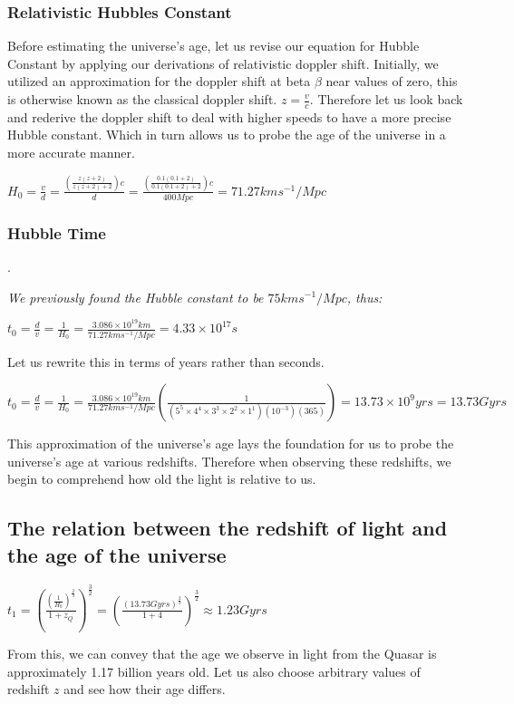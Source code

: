 \documentclass{article}
\begin{document}
{\subsubsection{Relativistic Hubbles Constant}
Before estimating the universe's age, let us revise our equation for Hubble Constant by applying our derivations of relativistic doppler shift. Initially, we utilized an approximation for the doppler shift at beta $\beta$ near values of zero, this is otherwise known as the classical doppler shift. $ z =\frac{v}{c}$. Therefore let us look back and rederive the doppler shift to deal with higher speeds to have a more precise Hubble constant. Which in turn allows us to probe the age of the universe in a more accurate manner.
\begin{center}
	$\boxed{
H_0 = \frac{v}{d} = \frac{ \left(\frac{z(z+2)}{z(z+2)+2}\right)c }{d} = \frac{ \left(\frac{0.1(0.1+2)}{0.1(0.1+2)+2}\right)c }{400Mpc} = 71.27 kms^{-1}/Mpc}
$
\end{center}
\subsubsection{Hubble Time}
.

\textit{We previously found the Hubble constant to be $75kms^{-1}/Mpc$, thus:}
\begin{center}
	$\boxed{
	t_0 = \frac{d}{v}=\frac{1}{H_0} = \frac{3.086\times10^{19}km}{71.27kms^{-1}/Mpc} = 4.33\times10^{17}s}
	$
\end{center}
Let us rewrite this in terms of years rather than seconds.
\begin{center}
	$\boxed{
		t_0 = \frac{d}{v}=\frac{1}{H_0}= \frac{3.086\times10^{19}km}{71.27kms^{-1}/Mpc}\left(\frac{1}{(5^5\times4^4\times3^3\times2^2\times1^1)(10^{-3})(365)}\right)=13.73\times10^9yrs=13.73Gyrs}
	$
\end{center}
This approximation of the universe's age lays the foundation for us to probe the universe's age at various redshifts. Therefore when observing these redshifts, we begin to comprehend how old the light is relative to us.
\subsection{The relation between the redshift of light and the age of the universe}

\begin{center}
	$\boxed{ t_1 = \left(\frac{\left(\frac{1}{H_0}\right)^{\frac{2}{3}}}{1+z_Q}\right)^{\frac{3}{2}} = \left(\frac{\left(13.73Gyrs\right)^{\frac{2}{3}}}{1+4}\right)^{\frac{3}{2}} \approx 1.23Gyrs}$
\end{center}
From this, we can convey that the age we observe in light from the Quasar is approximately 1.17 billion years old. Let us also choose arbitrary values of redshift $z$ and see how their age differs.

}
\end{document}

